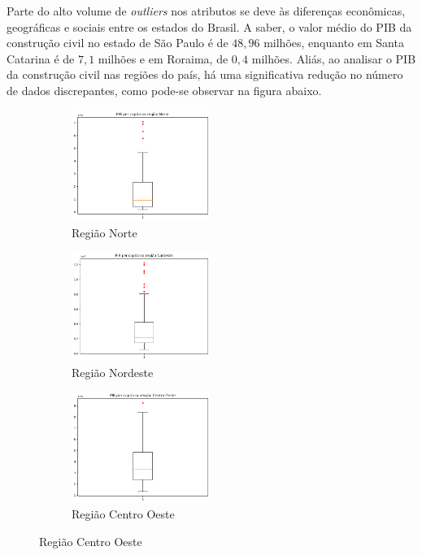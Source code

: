 Parte do alto volume de \textit{outliers} nos atributos se deve às diferenças
econômicas, geográficas e sociais entre os estados do Brasil. A saber, o valor 
médio do PIB da construção civil no estado 
de São Paulo é de $48,96$ milhões, enquanto em Santa Catarina é de $7,1$ milhões e 
em Roraima, de $0,4$ milhões. Aliás, ao analisar o PIB da construção civil nas 
regiões do país, há uma significativa redução no número de dados discrepantes, como 
pode-se observar na figura abaixo.

\begin{figure}[H] 
    \centering
    \begin{subfigure}{5cm}
      \centering 
      \includegraphics[width=4.5cm]{../figuras/graficos/boxplot-pib-cc-n.png}
      \caption{Região Norte}
      \label{fig:boxplot-n}
    \end{subfigure}
    \hfill 
    \begin{subfigure}{5cm}
        \centering 
        \includegraphics[width=4.5cm]{../figuras/graficos/boxplot-pib-cc-ne.png}
        \caption{Região Nordeste}
        \label{fig:boxplot-ne}
    \end{subfigure}
    \begin{subfigure}{5cm}
        \centering 
        \includegraphics[width=4.5cm]{../figuras/graficos/boxplot-pib-cc-co.png}
        \caption{Região Centro Oeste}
        \label{fig:boxplot-co}
    \end{subfigure}

\end{figure}
